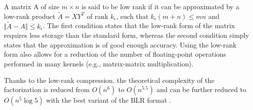 A matrix A of size $ m \times n $ is said to be low rank if it can be approximated by a low-rank product $ \tilde{A} = XY^{T}$ of rank $ k_{\epsilon} $, such that $ k_{\epsilon}(m+n)\leq mn $ and $ \Vert \tilde{A} - A \Vert \leq  k_{\epsilon} $. The first condition states that the low-rank form of the matrix requires less storage than the standard form, whereas the second condition simply states that the approximation is of good enough accuracy. Using the low-rank form also allows for a reduction of the number of floating-point operations performed in many kernels (e.g., matrix-matrix multiplication).

Thanks to the low-rank compression, the theoretical complexity of the factorization is reduced from $ O(n^{6})$ to $ O(n^{5.5})$ and can be further reduced to $ O(n^{5} \log 5 )$ with the best variant of the BLR format \cite{Amestoy2016}.


